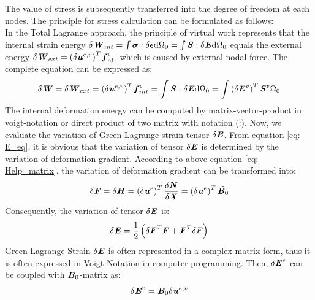 The value of stress is subsequently transferred into the degree of freedom at each nodes. The principle for stress calculation can be formulated as follows:\\
In the Total Lagrange approach, the principle of virtual work represents that the internal strain energy $\delta \textbf{\textit{W}}_{int} = \int \boldsymbol{\sigma} : \delta \boldsymbol{\epsilon} \mathrm{d}\Omega_0 = \int \textbf{\textit{S}} : \delta \textbf{\textit{E}} \mathrm{d}\Omega_0$ equals the external energy $\delta \textbf{\textit{W}}_{ext} = \left(\delta \textbf{\textit{u}}^{e,v}\right)^T \textbf{\textit{f}}_{nl}^v$, which is caused by external nodal force. The complete equation can be expressed as:
\begin{equation} \label{eq: W}
\delta \textbf{\textit{W}} = \delta \textbf{\textit{W}}_{ext} = \left(\delta \textbf{\textit{u}}^{e,v}\right)^T \textbf{\textit{f}}_{int}^v = \int \textbf{\textit{S}} : \delta \textbf{\textit{E}} \mathrm{d}\Omega_0 = \int \left( \delta \textbf{\textit{E}}^v\right)^T \textbf{\textit{S}}^v \mathrm{\Omega_0}
\end{equation}
The internal deformation energy can be computed by matrix-vector-product in voigt-notation or direct product of two matrix with notation (:). Now, we evaluate the variation of Green-Lagrange strain tensor $\delta \textbf{\textit{E}}$. From equation \ref{eq: E_eq}, it is obvious that the variation of tensor $\delta \textbf{\textit{E}}$ is determined by the variation of deformation gradient. According to above equation \ref{eq: Help_matrix}, the variation of deformation gradient can be transformed into:
\begin{equation}
\delta \textbf{\textit{F}} = \delta \textbf{\textit{H}} = \left(\delta \textbf{\textit{u}}^e\right)^T \frac{\delta \textbf{\textit{N}}}{\delta \textbf{\textit{X}}} = \left(\delta \textbf{\textit{u}}^e\right)^T \tilde{\textbf{\textit{B}}_0}
\end{equation}
Consequently, the variation of tensor $\delta \textbf{\textit{E}}$ is:
\begin{equation}
\delta \textbf{\textit{E}} = \frac{1}{2} \left(\delta \textbf{\textit{F}}^T \textbf{\textit{F}} + \textbf{\textit{F}}^T \delta F \right)
\end{equation}
Green-Lagrange-Strain $\delta \textbf{\textit{E}}$ is often represented in a complex matrix form, thus it is often expressed in Voigt-Notation in computer programming. Then, $\delta \textbf{\textit{E}}^v$ can be coupled with $\textbf{\textit{B}}_0$-matrix as:
\begin{equation} \label{eq: E_voigt}
\delta \textbf{\textit{E}}^v = \textbf{\textit{B}}_0 \delta \textbf{\textit{u}}^{e,v}
\end{equation} 
